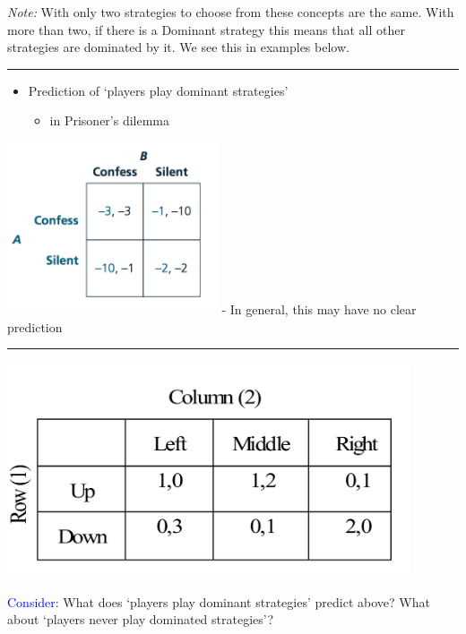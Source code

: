 \documentclass[]{article}
\providecommand{\tightlist}{%
  \setlength{\itemsep}{0pt}\setlength{\parskip}{0pt}}
\begin{document}
\bigskip

\emph{Note:} With only two strategies to choose from these concepts are the same.
With more than two, if there is a Dominant strategy this means that all other strategies are dominated by it. We see this in examples below.

\begin{center}\rule{0.5\linewidth}{\linethickness}\end{center}

\begin{itemize}
\tightlist
\item
  Prediction of `players play dominant strategies'

  \begin{itemize}
  \tightlist
  \item
    in Prisoner's dilemma
  \end{itemize}
\end{itemize}

\includegraphics[height=2in]{picsfigs/pd_normal.png}
- In general, this may have no clear prediction

\begin{center}\rule{0.5\linewidth}{\linethickness}\end{center}

\includegraphics[height=2.5in]{picsfigs/matrixforISD.png}

\textcolor{blue}{Consider}: What does `players play dominant strategies' predict above? What about `players never play dominated strategies'?
\end{document}
